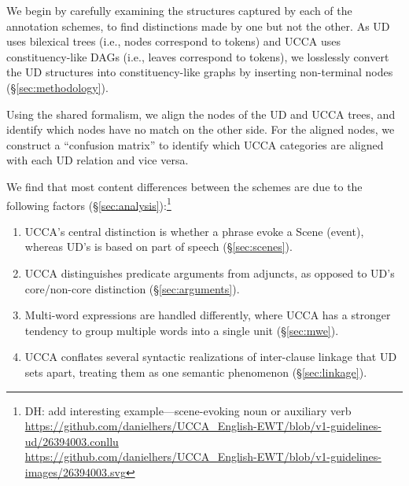 \documentclass[11pt,a4paper]{article}
\newcommand{\daniel}[1]{\footnote{\color{blue}DH: #1}}
\begin{document}
  We begin by carefully examining the structures captured by each of the annotation schemes, to find distinctions made by one but not the other. As UD uses bilexical trees (i.e., nodes correspond to tokens) and UCCA uses constituency-like DAGs (i.e., leaves
  correspond to tokens), we losslessly convert the UD structures into constituency-like
  graphs by inserting non-terminal nodes (\S\ref{sec:methodology}). 
  
  Using the shared formalism, we align the nodes of the UD and UCCA trees, and identify which nodes have no match on the other side. For the aligned nodes, we construct a ``confusion matrix'' to identify which UCCA categories are aligned with each UD relation and vice versa. 
  
  
   We find that most content differences between the schemes are due to the following
   factors (\S\ref{sec:analysis}):\daniel{add interesting example---scene-evoking noun or auxiliary verb
   \\\url{https://github.com/danielhers/UCCA_English-EWT/blob/v1-guidelines-ud/26394003.conllu} \\\url{https://github.com/danielhers/UCCA_English-EWT/blob/v1-guidelines-images/26394003.svg}}

  \begin{enumerate}[noitemsep]
        \item UCCA's central distinction is whether a phrase evoke a Scene (event),
        whereas UD's is based on part of speech (\S\ref{sec:scenes}).
        \item UCCA distinguishes predicate arguments from adjuncts,
        as opposed to UD's core/non-core distinction (\S\ref{sec:arguments}).
        \item Multi-word expressions are handled differently,
        where UCCA has a stronger tendency to group multiple words into a single unit (\S\ref{sec:mwe}).
        \item UCCA conflates several syntactic realizations of inter-clause linkage that UD sets apart,
        treating them as one semantic phenomenon (\S\ref{sec:linkage}).
   \end{enumerate}
    
\end{document}
